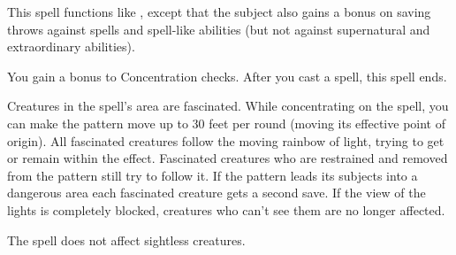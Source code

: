 \begin{spelleffect}
  This spell functions like , except that the subject also gains a  bonus on saving throws against spells and spell-like abilities (but not against supernatural and extraordinary abilities).
\end{spelleffect}

\begin{spelleffect}
  You gain a  bonus to Concentration checks. After you cast a spell, this spell ends.
\end{spelleffect}

\begin{comment}
\subsubsection{Q-R}
\end{comment}

\spellrng{\rngmed}
\begin{spelleffect}
  Creatures in the spell's area are fascinated. While concentrating on the spell, you can make the pattern move up to 30 feet per round (moving its effective point of origin). All fascinated creatures follow the moving rainbow of light, trying to get or remain within the effect. Fascinated creatures who are restrained and removed from the pattern still try to follow it. If the pattern leads its subjects into a dangerous area each fascinated creature gets a second save. If the view of the lights is completely blocked, creatures who can't see them are no longer affected.
\end{spelleffect}
\begin{spellnotes}
  The spell does not affect sightless creatures.
\end{spellnotes}

